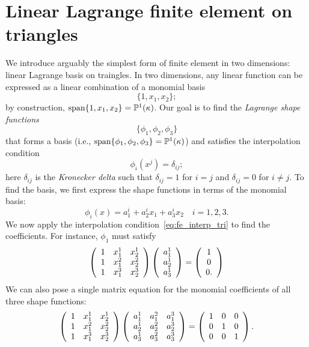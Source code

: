 \section{Linear Lagrange finite element on triangles}
\label{sec:fe_lin_tri}
We introduce arguably the simplest form of finite element in two dimensions: linear Lagrange basis on traingles.  In two dimensions, any linear function can be expressed as a linear combination of a monomial basis
\begin{equation*}
  \{ 1, x_1, x_2\};
\end{equation*}
by construction, $\text{span}\{1,x_1,x_2\} = \PP^1(\kappa)$. Our goal is to find the \emph{Lagrange shape functions}
\begin{equation*}
  \{ \phi_1, \phi_2, \phi_3 \}
\end{equation*}
that forms a basis (i.e., $\text{span}\{ \phi_1, \phi_2, \phi_3 \} = \PP^1(\kappa)$) and satisfies the interpolation condition
\begin{equation}
  \phi_i(x^j) = \delta_{ij};  \label{eq:fe_interp_tri}
\end{equation}
here $\delta_{ij}$ is the \emph{Kronecker delta} such that $\delta_{ij} = 1$ for $i = j$ and $\delta_{ij} = 0$ for $i \neq j$.  To find the basis, we first express the shape functions in terms of the monomial basis:
\begin{equation}
  \phi_i(x) = a^i_1 + a^i_2 x_1 + a_3^i x_2 \quad i = 1, 2, 3.
  \label{eq:fe_lin_tri_rep}
\end{equation}
We now apply the interpolation condition~\eqref{eq:fe_interp_tri} to find the coefficients.  For instance, $\phi_1$ must satisfy
\begin{equation*}
  \bmat{ccc}
  1 & x_1^1 & x_2^1 \\
  1 & x_1^2 & x_2^2 \\
  1 & x_1^3 & x_2^3 \\
  \emat
  \bmat{ccc}
  a_1^1 \\ a_2^1 \\ a_3^1
  \emat
  =
  \bmat{ccc}
  1 \\ 0 \\ 0.
  \emat
\end{equation*}
We can also pose a single matrix equation for the monomial coefficients of all three shape functions: 
\begin{equation*}
  \bmat{ccc}
  1 & x_1^1 & x_2^1 \\
  1 & x_1^2 & x_2^2 \\
  1 & x_1^3 & x_2^3 \\
  \emat
  \bmat{ccc}
  a_1^1 & a_1^2 & a_1^3 \\
  a_2^1 & a_2^2 & a_2^3 \\
  a_3^1 & a_3^2 & a_3^3 \\
  \emat
  =
  \bmat{ccc}
  1 & 0 & 0 \\
  0 & 1 & 0 \\
  0 & 0 & 1
  \emat.
\end{equation*}

